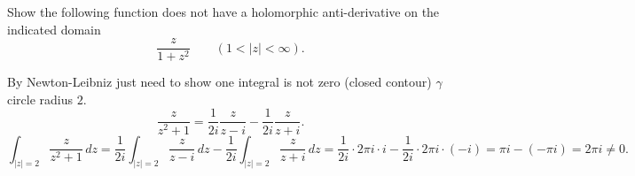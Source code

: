 \documentclass[10pt, a4paper]{article}
\begin{document}
\begin{problem}
    Show the following function does not have a holomorphic anti-derivative on the indicated domain
    \[
    \frac{z}{1 + z ^ 2}\qquad(1 < |z| < \infty).
    \]

    \begin{solution}
        By Newton-Leibniz just need to show one integral is not zero
        (closed contour)
        $\gamma$ circle radius $2$.
        \[
        \frac{z}{z ^ 2 + 1} = \frac{1}{2i}\frac{z}{z - i} - \frac{1}{2i}\frac{z}{z + i}.
        \]
        \[
        \int_{|z| = 2}\frac{z}{z ^ 2 + 1}\,dz = \frac{1}{2i}\int_{|z| = 2}\frac{z}{z - i}\,dz - \frac{1}{2i}\int_{|z| = 2}\frac{z}{z + i}\,dz = \frac{1}{2i}\cdot 2\pi i\cdot i - \frac{1}{2i}\cdot 2\pi i\cdot (-i) = \pi i - (-\pi i) = 2\pi i \neq 0.
        \]
    \end{solution}
\end{problem}
\end{document}
